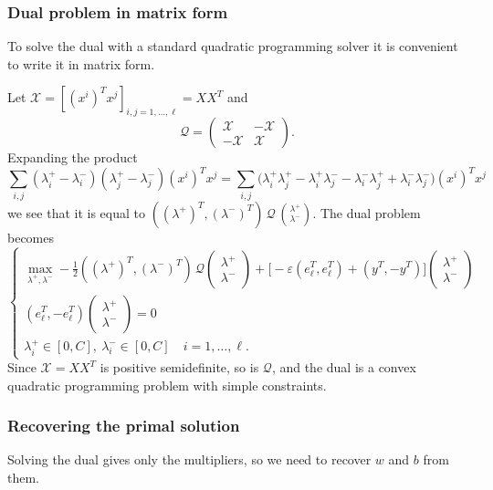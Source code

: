 \subsubsection{Dual problem in matrix form}

To solve the dual with a standard quadratic programming solver it is convenient to write it in matrix form.

Let $\mathcal{X} = [(x^i)^Tx^j]_{i,j=1,\dots,\ell} = XX^T$ and
\[
\mathcal{Q} = \begin{pmatrix} \mathcal{X} & -\mathcal{X}\\ -\mathcal{X} & \mathcal{X} \end{pmatrix}.
\]
Expanding the product
\[
\sum_{i,j}(\lambda_i^+ - \lambda_i^-)(\lambda_j^+ - \lambda_j^-)(x^i)^Tx^j
= \sum_{i,j}\bigl(\lambda_i^+\lambda_j^+ - \lambda_i^+\lambda_j^- - \lambda_i^-\lambda_j^+ + \lambda_i^-\lambda_j^-\bigr)(x^i)^Tx^j
\]
we see that it is equal to $((\lambda^+)^T,(\lambda^-)^T)\,\mathcal{Q}\,\binom{\lambda^+}{\lambda^-}$. The dual problem becomes
\[
\begin{cases}
\displaystyle \max_{\lambda^+,\lambda^-} -\frac{1}{2}((\lambda^+)^T,(\lambda^-)^T)\,\mathcal{Q}\begin{pmatrix} \lambda^+\\ \lambda^- \end{pmatrix} + \bigl[-\varepsilon(e_\ell^T,e_\ell^T) + (y^T,-y^T)\bigr]\begin{pmatrix} \lambda^+\\ \lambda^- \end{pmatrix}\\[1ex]
(e_\ell^T,-e_\ell^T)\begin{pmatrix} \lambda^+\\ \lambda^- \end{pmatrix} = 0\\[1ex]
\lambda_i^+ \in [0,C],\ \lambda_i^- \in [0,C] \quad i=1,\dots,\ell.
\end{cases}
\]
Since $\mathcal{X} = XX^T$ is positive semidefinite, so is $\mathcal{Q}$, and the dual is a convex quadratic programming problem with simple constraints.

\subsubsection{Recovering the primal solution}

Solving the dual gives only the multipliers, so we need to recover $w$ and $b$ from them.

